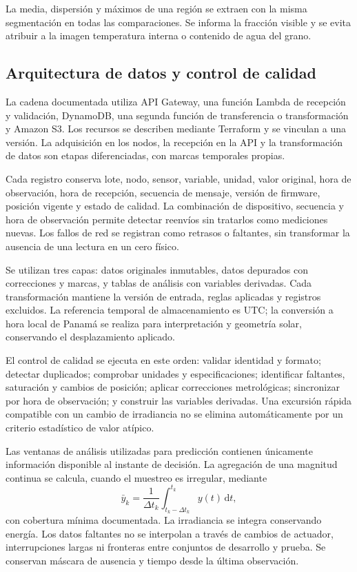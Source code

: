 La media, dispersión y máximos de una región se extraen con la misma segmentación en todas las comparaciones. Se informa la fracción visible y se evita atribuir a la imagen temperatura interna o contenido de agua del grano.

\subsection{Arquitectura de datos y control de calidad}

La cadena documentada utiliza API Gateway, una función Lambda de recepción y validación, DynamoDB, una segunda función de transferencia o transformación y Amazon S3. Los recursos se describen mediante Terraform y se vinculan a una versión. La adquisición en los nodos, la recepción en la API y la transformación de datos son etapas diferenciadas, con marcas temporales propias.

Cada registro conserva lote, nodo, sensor, variable, unidad, valor original, hora de observación, hora de recepción, secuencia de mensaje, versión de firmware, posición vigente y estado de calidad. La combinación de dispositivo, secuencia y hora de observación permite detectar reenvíos sin tratarlos como mediciones nuevas. Los fallos de red se registran como retrasos o faltantes, sin transformar la ausencia de una lectura en un cero físico.

Se utilizan tres capas: datos originales inmutables, datos depurados con correcciones y marcas, y tablas de análisis con variables derivadas. Cada transformación mantiene la versión de entrada, reglas aplicadas y registros excluidos. La referencia temporal de almacenamiento es UTC; la conversión a hora local de Panamá se realiza para interpretación y geometría solar, conservando el desplazamiento aplicado.

El control de calidad se ejecuta en este orden: validar identidad y formato; detectar duplicados; comprobar unidades y especificaciones; identificar faltantes, saturación y cambios de posición; aplicar correcciones metrológicas; sincronizar por hora de observación; y construir las variables derivadas. Una excursión rápida compatible con un cambio de irradiancia no se elimina automáticamente por un criterio estadístico de valor atípico.

Las ventanas de análisis utilizadas para predicción contienen únicamente información disponible al instante de decisión. La agregación de una magnitud continua se calcula, cuando el muestreo es irregular, mediante
\begin{equation}
\bar y_k=\frac{1}{\Delta t_k}\int_{t_k-\Delta t_k}^{t_k}y(t)\,\mathrm dt,
\label{met:agregacion_causal}
\end{equation}
con cobertura mínima documentada. La irradiancia se integra conservando energía. Los datos faltantes no se interpolan a través de cambios de actuador, interrupciones largas ni fronteras entre conjuntos de desarrollo y prueba. Se conservan máscara de ausencia y tiempo desde la última observación.

